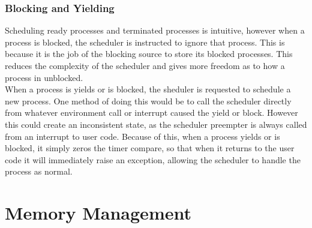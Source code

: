 \subsubsection{Blocking and Yielding}
Scheduling ready processes and terminated processes is intuitive, however when a process is blocked, the scheduler is instructed to ignore that process. This is because it is the job of the blocking source to store its blocked processes. This reduces the complexity of the scheduler and gives more freedom as to how a process in unblocked. \\
When a process is yields or is blocked, the sheduler is requested to schedule a new process. One method of doing this would be to call the scheduler directly from whatever environment call or interrupt caused the yield or block. However this could create an inconsistent state, as the scheduler preempter is always called from an interrupt to user code. Because of this, when a process yields or is blocked, it simply zeros the timer compare, so that when it returns to the user code it will immediately raise an exception, allowing the scheduler to handle the process as normal.
\section{Memory Management}
